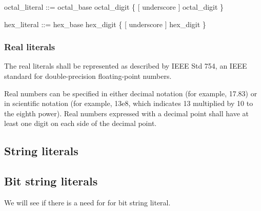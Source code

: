 \begin{bnf}
octal\_literal ::= octal\_base  octal\_digit \{ [ underscore ] octal\_digit \}
\end{bnf}

\begin{bnf}
hex\_literal ::= hex\_base  hex\_digit \{ [ underscore ] hex\_digit \}
\end{bnf}

\subsubsection{Real literals}

The real literals shall be represented as described by IEEE Std 754, an IEEE standard for double-precision floating-point numbers.

Real numbers can be specified in either decimal notation (for example, 17.83) or in scientific notation (for example, 13e8, which indicates 13 multiplied by 10 to the eighth power).
Real numbers expressed with a decimal point shall have at least one digit on each side of the decimal point.

\subsection{String literals}

\subsection{Bit string literals}

We will see if there is a need for for bit string literal.
